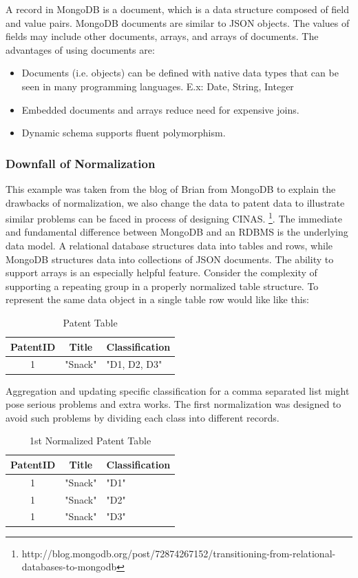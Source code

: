 \documentclass{sig-alternate}
\begin{document}
{A record in MongoDB is a document, which is a data structure composed of field and value pairs. MongoDB documents are similar to JSON objects. The values of fields may include other documents, arrays, and arrays of documents. The advantages of using documents are:
\begin{itemize}
\item Documents (i.e. objects) can be defined with native data types that can be seen in many programming languages. E.x: Date, String, Integer
\item Embedded documents and arrays reduce need for expensive joins.
\item Dynamic schema supports fluent polymorphism.
\end{itemize}

\subsubsection{Downfall of Normalization }
This example was taken from the blog of Brian from MongoDB to explain the drawbacks of normalization, we also change the data to patent data to illustrate similar problems can be faced in process of designing CINAS. \footnote{http://blog.mongodb.org/post/72874267152/transitioning-from-relational-databases-to-mongodb}. The immediate and fundamental difference between MongoDB and an RDBMS is the underlying data model. A relational database structures data into tables and rows, while MongoDB structures data into collections of JSON documents. The ability to support arrays is an especially helpful feature. Consider the complexity of supporting a repeating group in a properly normalized table structure. To represent the same data object in a single table row would like like this:
\begin{table}[htb]
\begin{tabular}{|c|c|l|} \hline
PatentID&Title&Classification\\ \hline
1& "Snack"& "D1, D2, D3"\\ \hline
\end{tabular}
\centering
\caption{Patent Table}
\end{table}
Aggregation and updating specific classification for a comma separated list might pose serious problems and extra works. The first normalization was designed to avoid such problems by dividing each class into different records.

\begin{table}[htb]
\begin{tabular}{|c|c|l|} \hline
PatentID&Title&Classification\\ \hline
1& "Snack"& "D1"\\ \hline
1& "Snack"& "D2"\\ \hline
1& "Snack"& "D3"\\ \hline
\end{tabular}
\centering
\caption{1st Normalized Patent Table}
\end{table}

}
\end{document}

